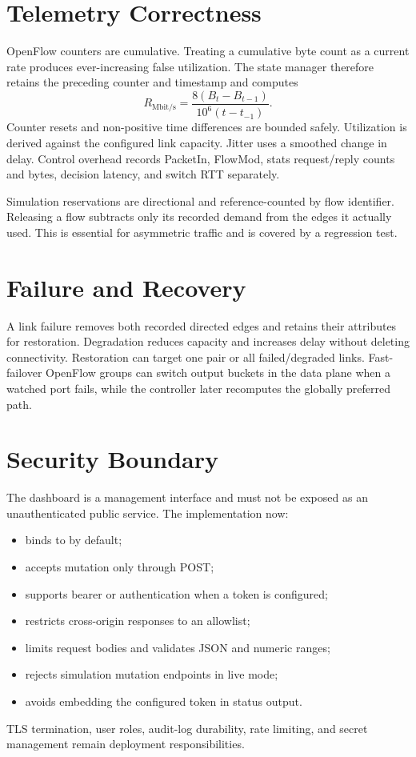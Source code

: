 \documentclass[12pt,a4paper,oneside]{report}
\newcommand{\code}[1]{\texttt{\seqsplit{#1}}}
\begin{document}
\section{Telemetry Correctness}
OpenFlow counters are cumulative. Treating a cumulative byte count as a current rate produces ever-increasing false utilization. The state manager therefore retains the preceding counter and timestamp and computes
\begin{equation}
R_{\mathrm{Mbit/s}}=\frac{8(B_t-B_{t-1})}{10^6(t-t_{-1})}.
\end{equation}
Counter resets and non-positive time differences are bounded safely. Utilization is derived against the configured link capacity. Jitter uses a smoothed change in delay. Control overhead records PacketIn, FlowMod, stats request/reply counts and bytes, decision latency, and switch RTT separately.

Simulation reservations are directional and reference-counted by flow identifier. Releasing a flow subtracts only its recorded demand from the edges it actually used. This is essential for asymmetric traffic and is covered by a regression test.

\section{Failure and Recovery}
A link failure removes both recorded directed edges and retains their attributes for restoration. Degradation reduces capacity and increases delay without deleting connectivity. Restoration can target one pair or all failed/degraded links. Fast-failover OpenFlow groups can switch output buckets in the data plane when a watched port fails, while the controller later recomputes the globally preferred path.

\section{Security Boundary}
The dashboard is a management interface and must not be exposed as an unauthenticated public service. The implementation now:
\begin{itemize}
  \item binds to \code{127.0.0.1} by default;
  \item accepts mutation only through POST;
  \item supports bearer or \code{X-API-Token} authentication when a token is configured;
  \item restricts cross-origin responses to an allowlist;
  \item limits request bodies and validates JSON and numeric ranges;
  \item rejects simulation mutation endpoints in live mode;
  \item avoids embedding the configured token in status output.
\end{itemize}
TLS termination, user roles, audit-log durability, rate limiting, and secret management remain deployment responsibilities.
\end{document}
